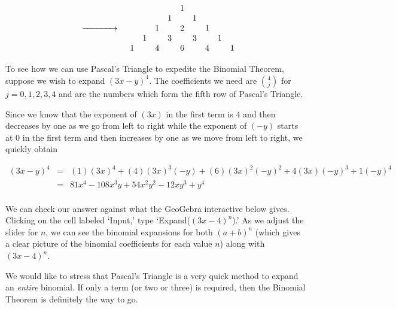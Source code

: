 \documentclass{ximera}
\begin{document}
\[\begin{array}{ccc}
\begin{array}{ccccccccc}
\end{array}

&

\xrightarrow{\hspace{.5in}}

&


\begin{array}{ccccccccc} 
&	&	&	&	1	&	&	&	&	\\ 
&	&	&	1	&	&	1	&	&	&\\
&	&	1	&	& 2	&	&1	&	&\\ 
&	1	&	&	3	&	& 3	&	&	1	&	\\ 
1	&	&	4	&	&	6	&	&	4 &	&	1 \\ 

\end{array} \\

\end{array} \]

 

To see how we can use Pascal's Triangle to expedite the Binomial Theorem, suppose we wish to expand $(3x-y)^{4}$.  The coefficients we need are $\binom{4}{j}$ for $j = 0, 1, 2, 3, 4$ and are the numbers which form the fifth row of Pascal's Triangle. 

 

Since we know that the exponent of $(3x)$ in the first term is $4$ and then decreases by one as we go from left to right while the exponent of $(-y)$ starts at $0$ in the first term and then increases by one as we move from left to right, we quickly obtain
 
\[ \begin{array}{rcl}

(3x-y)^{4} & = & (1)(3x)^{4} + (4)(3x)^3(-y) + (6)(3x)^2(-y)^2 + 4(3x)(-y)^3 + 1(-y)^4 \\
           & = & 81x^4 - 108x^3y + 54x^2y^2 -12xy^3 + y^4 \\
\end{array} \]

We can check our answer against what the GeoGebra interactive below gives. Clicking on the cell labeled `Input,' type `Expand($(3x-4)^n$).'  As we adjust the slider for $n$, we can see the binomial expansions for both $(a+b)^n$ (which gives a clear picture of the binomial coefficients for each value $n$) along with $(3x-4)^n$.


\begin{center}
\end{center}

We would like to stress that Pascal's Triangle is a very quick method to expand an \textit{entire} binomial.  If only a term (or two or three) is required, then the Binomial Theorem is definitely the way to go.  



\closegraphsfile
\end{document}
